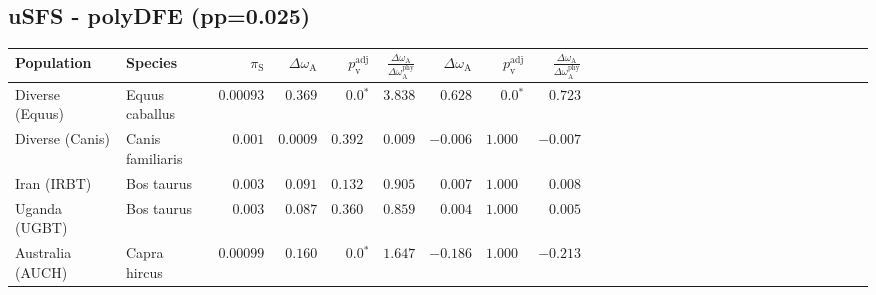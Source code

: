 \subsection{uSFS - polyDFE (pp=0.025)} 
\begin{center}
\begin{adjustbox}{width = 1\textwidth}
\begin{tabular}{|l|l|r|r|r|r|r|r|r|r|r|r|r|r|r|r|r|r|r|r|r|r|r|r|r|r|r|r|r|}
\toprule
                     Population &              Species & $\pi_{\textrm{S}}$ & $\Delta \omega_{\mathrm{A}} $ & $p_{\mathrm{v}}^{\mathrm{adj}}$ & $\frac{\Delta\omega_{\mathrm{A}}}{\Delta\omega_{\mathrm{A}}^{\mathrm{phy}}}$ & $\Delta \omega_{\mathrm{A}} $ & $p_{\mathrm{v}}^{\mathrm{adj}}$ & $\frac{\Delta\omega_{\mathrm{A}}}{\Delta\omega_{\mathrm{A}}^{\mathrm{phy}}}$ \\
\midrule
                Diverse (Equus) &       Equus caballus &          $0.00093$ &                      $ 0.369$ &                  $\bm{0.0{^*}}$ &                                           $ 3.838$ &                      $ 0.628$ &                  $\bm{0.0{^*}}$ &                                           $ 0.723$ \\
                Diverse (Canis) &     Canis familiaris &           $ 0.001$ &                      $0.0009$ &                      $ 0.392~~$ &                                           $ 0.009$ &                      $-0.006$ &                      $ 1.000~~$ &                                           $-0.007$ \\
                    Iran (IRBT) &           Bos taurus &           $ 0.003$ &                      $ 0.091$ &                      $ 0.132~~$ &                                           $ 0.905$ &                      $ 0.007$ &                      $ 1.000~~$ &                                           $ 0.008$ \\
                  Uganda (UGBT) &           Bos taurus &           $ 0.003$ &                      $ 0.087$ &                      $ 0.360~~$ &                                           $ 0.859$ &                      $ 0.004$ &                      $ 1.000~~$ &                                           $ 0.005$ \\
               Australia (AUCH) &         Capra hircus &          $0.00099$ &                      $ 0.160$ &                  $\bm{0.0{^*}}$ &                                           $ 1.647$ &                      $-0.186$ &                      $ 1.000~~$ &                                           $-0.213$ \\

\end{tabular}
\end{adjustbox}
\end{center}
